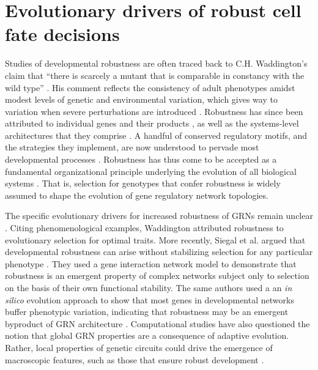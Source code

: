 \section{Evolutionary drivers of robust cell fate decisions}

Studies of developmental robustness are often traced back to C.H. Waddington’s claim that “there is scarcely a mutant that is comparable in constancy with the wild type” \cite{Waddington1942}. His comment reflects the consistency of adult phenotypes amidst modest levels of genetic and environmental variation, which gives way to variation when severe perturbations are introduced \cite{Bateman1959,Rendel1959,Rendel1966,Scharloo1991}. Robustness has since been attributed to individual genes and their products \cite{Dun1958,Hogness1996,Rutherford1998}, as well as the systems-level architectures that they comprise \cite{Rutherford1998,Paulsen2011,Li2009,Eldar2002,Denby2012,Cassidy2013,Cassidy2016}. A handful of conserved regulatory motifs, and the strategies they implement, are now understood to pervade most developmental processes \cite{Freeman2000,Hartman2001,Alon2007,Marciano2014}. Robustness has thus come to be accepted as a fundamental organizational principle underlying the evolution of all biological systems \cite{Kitano2004}. That is, selection for genotypes that confer robustness is widely assumed to shape the evolution of gene regulatory network topologies. 

The specific evolutionary drivers for increased robustness of GRNs remain unclear \cite{Siegal2014}. Citing phenomenological examples, Waddington attributed robustness to evolutionary selection for optimal traits. More recently, Siegal et al. argued that developmental robustness can arise without stabilizing selection for any particular phenotype \cite{Siegal2002}. They used a gene interaction network model to demonstrate that robustness is an emergent property of complex networks subject only to selection on the basis of their own functional stability. The same authors used a an \textit{in silico} evolution approach to show that most genes in developmental networks buffer phenotypic variation, indicating that robustness may be an emergent byproduct of GRN architecture \cite{Bergman2003}. Computational studies have also questioned the notion that global GRN properties are a consequence of adaptive evolution. Rather, local properties of genetic circuits could drive the emergence of macroscopic features, such as those that ensure robust development \cite{Lynch2007,Wagner2003}.

